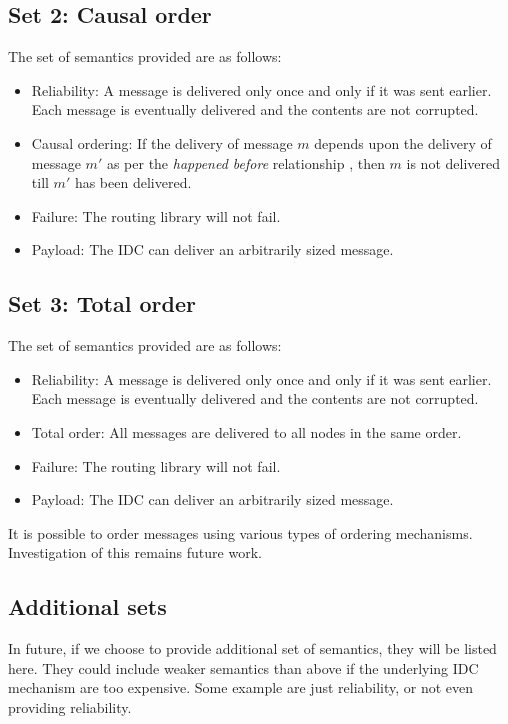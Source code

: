 \documentclass[a4paper,twoside]{report} %
\begin{document}
\subsection{Set 2: Causal order}
The set of semantics provided are as follows:

\begin{itemize}
\item Reliability:
  A message is delivered only once and only if it was sent earlier.
  Each message is eventually delivered and the contents are not corrupted.
\item Causal ordering:
  If the delivery of message $m$ depends upon the delivery of message $m'$ as
  per the \emph{happened before} relationship \cite{events-time},
  then $m$ is not delivered till $m'$ has been delivered.
\item Failure:
  The routing library will not fail.
\item Payload:
  The IDC can deliver an arbitrarily sized message.
\end{itemize}

\subsection{Set 3: Total order}
The set of semantics provided are as follows:

\begin{itemize}
\item Reliability:
  A message is delivered only once and only if it was sent earlier.
  Each message is eventually delivered and the contents are not corrupted.
\item Total order:
  All messages are delivered to all nodes in the same order.
\item Failure:
  The routing library will not fail.
\item Payload:
  The IDC can deliver an arbitrarily sized message.
\end{itemize}

It is possible to order messages using various types of ordering mechanisms.
Investigation of this remains future work.

\subsection{Additional sets}
In future, if we choose to provide additional set of semantics,
they will be listed here.
They could include weaker semantics than above if the underlying IDC mechanism
are too expensive.
Some example are just reliability, or not even providing reliability.
\end{document}
